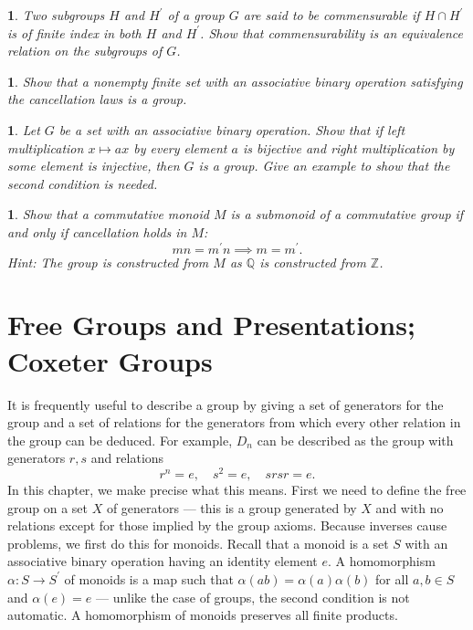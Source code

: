\documentclass[a4paper,11pt,final]{memoir}%
\newtheorem{exercise}[Y]{}
\theoremstyle{nonumberplain}
\begin{document}
\begin{exercise}
\label{x4b}Two subgroups $H$ and $H^{\prime}$ of a group $G$ are said to be
\emph{commensurable} if $H\cap H^{\prime}$ is of finite index in both $H$ and
$H^{\prime}$. Show that commensurability is an equivalence relation on the
subgroups of $G$.
\end{exercise}

\begin{exercise}
\label{x4c}Show that a nonempty finite set with an associative binary
operation satisfying the cancellation laws is a group.
\end{exercise}

\begin{exercise}
\label{x4e}Let $G$ be a set with an associative binary operation. Show that if
left multiplication $x\mapsto ax$ by every element $a$ is bijective and right
multiplication by some element is injective, then $G$ is a group. Give an
example to show that the second condition is needed.
\end{exercise}

\begin{exercise}
\label{x0}Show that a commutative monoid $M$ is a submonoid of a commutative
group if and only if cancellation holds in $M$:%
\[
mn=m^{\prime}n\implies m=m^{\prime}.
\]
Hint: The group is constructed from $M$ as $\mathbb{Q}{}$ is constructed from
$\mathbb{Z}{}$.
\end{exercise}

\clearpage


\chapter{Free Groups and Presentations; Coxeter Groups}

It is frequently useful to describe a group by giving a set of generators for
the group and a set of relations for the generators from which every other
relation in the group can be deduced. For example, $D_{n}$ can be described as
the group with generators $r,s$ and relations
\[
r^{n}=e,\quad s^{2}=e,\quad srsr=e.
\]
In this chapter, we make precise what this means. First we need to define the
free group on a set $X$ of generators --- this is a group generated by $X$ and
with no relations except for those implied by the group axioms. Because
inverses cause problems, we first do this for monoids. Recall that a monoid is
a set $S$ with an associative binary operation having an identity element $e$.
A homomorphism $\alpha\colon S\rightarrow S^{\prime}$ of monoids is a map such
that $\alpha(ab)=\alpha(a)\alpha(b)$ for all $a,b\in S$ and $\alpha(e)=e$ ---
unlike the case of groups, the second condition is not automatic. A
homomorphism of monoids preserves all finite products.
\end{document}
